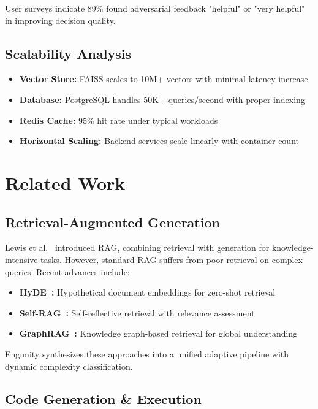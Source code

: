 \documentclass[conference]{IEEEtran}
\begin{document}
User surveys indicate 89\% found adversarial feedback "helpful" or "very helpful" in improving decision quality.

\subsection{Scalability Analysis}

\begin{itemize}
    \item \textbf{Vector Store:} FAISS scales to 10M+ vectors with minimal latency increase
    \item \textbf{Database:} PostgreSQL handles 50K+ queries/second with proper indexing
    \item \textbf{Redis Cache:} 95\% hit rate under typical workloads
    \item \textbf{Horizontal Scaling:} Backend services scale linearly with container count
\end{itemize}


\section{Related Work}

\subsection{Retrieval-Augmented Generation}

Lewis et al.~\cite{lewis2020retrieval} introduced RAG, combining retrieval with generation for knowledge-intensive tasks. However, standard RAG suffers from poor retrieval on complex queries. Recent advances include:

\begin{itemize}
    \item \textbf{HyDE~\cite{gao2022precise}:} Hypothetical document embeddings for zero-shot retrieval
    \item \textbf{Self-RAG~\cite{asai2023self}:} Self-reflective retrieval with relevance assessment
    \item \textbf{GraphRAG~\cite{edge2024graphrag}:} Knowledge graph-based retrieval for global understanding
\end{itemize}

Engunity synthesizes these approaches into a unified adaptive pipeline with dynamic complexity classification.

\subsection{Code Generation \& Execution}
\end{document}
